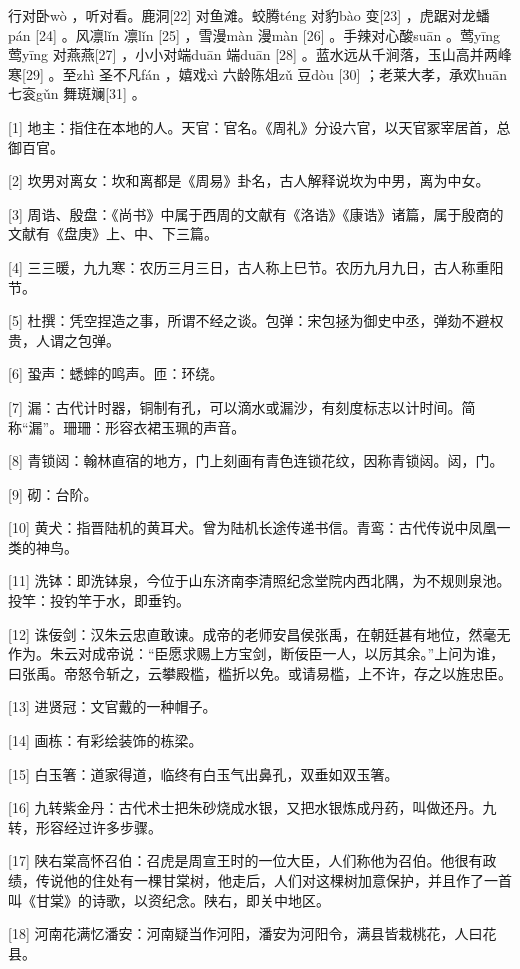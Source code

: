 \documentclass[12pt,UTF8]{ctexbook}
\begin{document}
行对卧wò ，听对看。鹿洞[22] 对鱼滩。蛟腾téng 对豹bào 变[23] ，虎踞对龙蟠pán [24] 。风凛lǐn 凛lǐn [25] ，雪漫màn 漫màn [26] 。手辣对心酸suān 。莺yīng 莺yīng 对燕燕[27] ，小小对端duān 端duān [28] 。蓝水远从千涧落，玉山高并两峰寒[29] 。至zhì 圣不凡fán ，嬉戏xì 六龄陈俎zǔ 豆dòu [30] ；老莱大孝，承欢huān 七衮gǔn 舞斑斓[31] 。


[1] 地主：指住在本地的人。天官：官名。《周礼》分设六官，以天官冢宰居首，总御百官。

[2] 坎男对离女：坎和离都是《周易》卦名，古人解释说坎为中男，离为中女。

[3] 周诰、殷盘：《尚书》中属于西周的文献有《洛诰》《康诰》诸篇，属于殷商的文献有《盘庚》上、中、下三篇。

[4] 三三暖，九九寒：农历三月三日，古人称上巳节。农历九月九日，古人称重阳节。

[5] 杜撰：凭空捏造之事，所谓不经之谈。包弹：宋包拯为御史中丞，弹劾不避权贵，人谓之包弹。

[6] 蛩声：蟋蟀的鸣声。匝：环绕。

[7] 漏：古代计时器，铜制有孔，可以滴水或漏沙，有刻度标志以计时间。简称“漏”。珊珊：形容衣裙玉珮的声音。

[8] 青锁闼：翰林直宿的地方，门上刻画有青色连锁花纹，因称青锁闼。闼，门。

[9] 砌：台阶。

[10] 黄犬：指晋陆机的黄耳犬。曾为陆机长途传递书信。青鸾：古代传说中凤凰一类的神鸟。

[11] 洗钵：即洗钵泉，今位于山东济南李清照纪念堂院内西北隅，为不规则泉池。投竿：投钓竿于水，即垂钓。

[12] 诛佞剑：汉朱云忠直敢谏。成帝的老师安昌侯张禹，在朝廷甚有地位，然毫无作为。朱云对成帝说：“臣愿求赐上方宝剑，断佞臣一人，以厉其余。”上问为谁，曰张禹。帝怒令斩之，云攀殿槛，槛折以免。或请易槛，上不许，存之以旌忠臣。

[13] 进贤冠：文官戴的一种帽子。

[14] 画栋：有彩绘装饰的栋梁。

[15] 白玉箸：道家得道，临终有白玉气出鼻孔，双垂如双玉箸。

[16] 九转紫金丹：古代术士把朱砂烧成水银，又把水银炼成丹药，叫做还丹。九转，形容经过许多步骤。

[17] 陕右棠高怀召伯：召虎是周宣王时的一位大臣，人们称他为召伯。他很有政绩，传说他的住处有一棵甘棠树，他走后，人们对这棵树加意保护，并且作了一首叫《甘棠》的诗歌，以资纪念。陕右，即关中地区。

[18] 河南花满忆潘安：河南疑当作河阳，潘安为河阳令，满县皆栽桃花，人曰花县。
\end{document}

